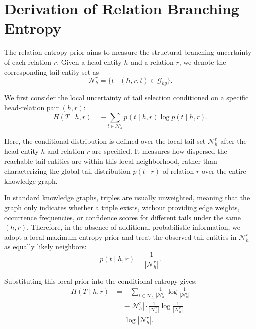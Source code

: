 \section{Derivation of Relation Branching Entropy}
\label{app:relation_entropy}

The relation entropy prior aims to measure the structural branching uncertainty of each relation \(r\). Given a head entity \(h\) and a relation \(r\), we denote the corresponding tail entity set as
\begin{equation}
\label{eq:app_tail_set}
\mathcal{N}_{h}^{r}=\{t \mid (h,r,t)\in \mathcal{G}_{kg}\}.
\end{equation}

We first consider the local uncertainty of tail selection conditioned on a specific head-relation pair \((h,r)\):
\begin{equation}
\label{eq:app_local_entropy}
H(T\mid h,r)
=
-\sum_{t\in \mathcal{N}_{h}^{r}}p(t\mid h,r)\log p(t\mid h,r).
\end{equation}

Here, the conditional distribution is defined over the local tail set \(\mathcal{N}_{h}^{r}\) after the head entity \(h\) and relation \(r\) are specified. It measures how dispersed the reachable tail entities are within this local neighborhood, rather than characterizing the global tail distribution \(p(t\mid r)\) of relation \(r\) over the entire knowledge graph.

In standard knowledge graphs, triples are usually unweighted, meaning that the graph only indicates whether a triple exists, without providing edge weights, occurrence frequencies, or confidence scores for different tails under the same \((h,r)\). Therefore, in the absence of additional probabilistic information, we adopt a local maximum-entropy prior and treat the observed tail entities in \(\mathcal{N}_{h}^{r}\) as equally likely neighbors:
\begin{equation}
\label{eq:app_local_uniform_prior}
p(t\mid h,r)=\frac{1}{|\mathcal{N}_{h}^{r}|}.
\end{equation}

Substituting this local prior into the conditional entropy gives:
\begin{equation}
\label{eq:app_entropy_derivation}
\begin{aligned}
	H(T\mid h,r)
	&=
	-\sum_{t\in \mathcal{N}_{h}^{r}}
	\frac{1}{|\mathcal{N}_{h}^{r}|}
	\log \frac{1}{|\mathcal{N}_{h}^{r}|} \\
	&=
	-|\mathcal{N}_{h}^{r}|
	\cdot
	\frac{1}{|\mathcal{N}_{h}^{r}|}
	\log \frac{1}{|\mathcal{N}_{h}^{r}|} \\
	&=
	\log |\mathcal{N}_{h}^{r}|.
\end{aligned}
\end{equation}

